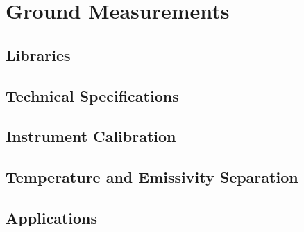 \chapter{Ground Measurements}

\section{Libraries}

\section{Technical Specifications}

\section{Instrument Calibration}

\section{Temperature and Emissivity Separation}

\section{Applications}
